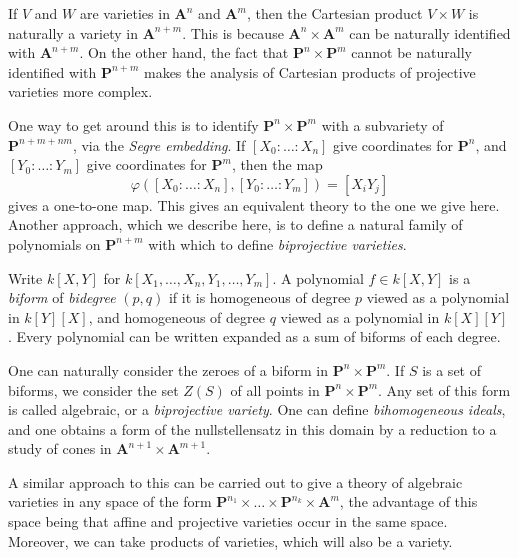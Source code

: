 If $V$ and $W$ are varieties in $\mathbf{A}^n$ and $\mathbf{A}^m$, then the Cartesian product $V \times W$ is naturally a variety in $\mathbf{A}^{n+m}$. This is because $\mathbf{A}^n \times \mathbf{A}^m$ can be naturally identified with $\mathbf{A}^{n+m}$. On the other hand, the fact that $\mathbf{P}^n \times \mathbf{P}^m$ cannot be naturally identified with $\mathbf{P}^{n+m}$ makes the analysis of Cartesian products of projective varieties more complex.

One way to get around this is to identify $\mathbf{P}^n \times \mathbf{P}^m$ with a subvariety of $\mathbf{P}^{n+m+nm}$, via the \emph{Segre embedding}. If $[X_0:\dots:X_n]$ give coordinates for $\mathbf{P}^n$, and $[Y_0:\dots:Y_m]$ give coordinates for $\mathbf{P}^m$, then the map
%
\[ \varphi([X_0:\dots:X_n],[Y_0:\dots:Y_m]) = [X_iY_j] \]
%
gives a one-to-one map. This gives an equivalent theory to the one we give here. Another approach, which we describe here, is to define a natural family of polynomials on $\mathbf{P}^{n+m}$ with which to define \emph{biprojective varieties}.

Write $k[X,Y]$ for $k[X_1,\dots,X_n,Y_1,\dots,Y_m]$. A polynomial $f \in k[X,Y]$ is a \emph{biform} of \emph{bidegree} $(p,q)$ if it is homogeneous of degree $p$ viewed as a polynomial in $k[Y][X]$, and homogeneous of degree $q$ viewed as a polynomial in $k[X][Y]$. Every polynomial can be written expanded as a sum of biforms of each degree.

One can naturally consider the zeroes of a biform in $\mathbf{P}^n \times \mathbf{P}^m$. If $S$ is a set of biforms, we consider the set $Z(S)$ of all points in $\mathbf{P}^n \times \mathbf{P}^m$. Any set of this form is called algebraic, or a \emph{biprojective variety}. One can define \emph{bihomogeneous ideals}, and one obtains a form of the nullstellensatz in this domain by a reduction to a study of cones in $\mathbf{A}^{n+1} \times \mathbf{A}^{m+1}$.

A similar approach to this can be carried out to give a theory of algebraic varieties in any space of the form $\mathbf{P}^{n_1} \times \dots \times \mathbf{P}^{n_k} \times \mathbf{A}^m$, the advantage of this space being that affine and projective varieties occur in the same space. Moreover, we can take products of varieties, which will also be a variety.

